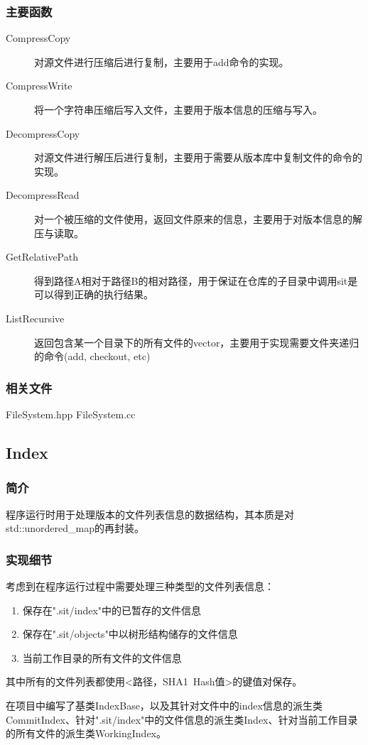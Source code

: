 \documentclass[11pt, a4paper, UTF8]{ctexart}
\begin{document}
\subsubsection{主要函数}
\begin{description}
	\item[CompressCopy] 对源文件进行压缩后进行复制，主要用于add命令的实现。
	\item[CompressWrite] 将一个字符串压缩后写入文件，主要用于版本信息的压缩与写入。
	\item[DecompressCopy] 对源文件进行解压后进行复制，主要用于需要从版本库中复制文件的命令的实现。
	\item[DecompressRead] 对一个被压缩的文件使用，返回文件原来的信息，主要用于对版本信息的解压与读取。
	\item[GetRelativePath] 得到路径A相对于路径B的相对路径，用于保证在仓库的子目录中调用sit是可以得到正确的执行结果。
	\item[ListRecursive] 返回包含某一个目录下的所有文件的vector，主要用于实现需要文件夹递归的命令(add, checkout, etc)
\end{description}
\subsubsection{相关文件}
FileSystem.hpp FileSystem.cc

\subsection{Index}
\subsubsection{简介}
程序运行时用于处理版本的文件列表信息的数据结构，其本质是对std::unordered\_map的再封装。
\subsubsection{实现细节}
考虑到在程序运行过程中需要处理三种类型的文件列表信息：
\begin{enumerate}
	\item 保存在".sit/index"中的已暂存的文件信息
	\item 保存在".sit/objects"中以树形结构储存的文件信息
	\item 当前工作目录的所有文件的文件信息
\end{enumerate}
其中所有的文件列表都使用<路径，SHA1~Hash值>的键值对保存。

在项目中编写了基类IndexBase，以及其针对文件中的index信息的派生类CommitIndex、针对".sit/index"中的文件信息的派生类Index、针对当前工作目录的所有文件的派生类WorkingIndex。
\end{document}
